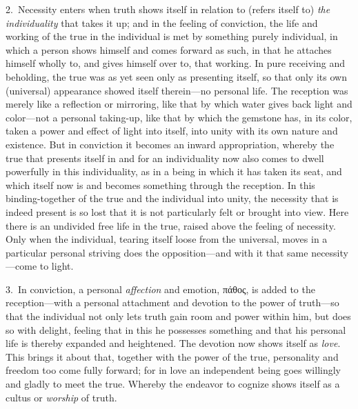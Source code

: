 \documentclass[12pt,a4paper]{book}
\begin{document}
2.~Necessity enters when truth shows itself in relation to (refers itself to)
\emph{the individuality} that takes it up; and in the feeling of conviction, the
life and working of the true in the individual is met by something purely
individual, in which a person shows himself and comes forward as such, in that
he attaches himself wholly to, and gives himself over to, that working. In pure
receiving and beholding, the true was as yet seen only as presenting itself, so
that only its own (universal) appearance showed itself therein---no personal
life. The reception was merely like a reflection or mirroring, like that by
which water gives back light and color---not a personal taking-up, like that by
which the gemstone has, in its color, taken a power and effect of light into
itself, into unity with its own nature and existence. But in conviction it
becomes an inward appropriation, whereby the true that presents itself in and
for an individuality now also comes to dwell powerfully in this individuality,
as in a being in which it has taken its seat, and which itself now is and
becomes something through the reception. In this binding-together of the true
and the individual into unity, the necessity that is indeed present is so lost
that it is not particularly felt or brought into view. Here there is an
undivided free life in the true, raised above the feeling of necessity.
Only when the individual, tearing itself loose from the universal, moves in a
particular personal striving does the opposition---and with it that same
necessity---come to light.

3.~In conviction, a personal \emph{affection} and emotion, πάθος, is added to
the reception---with a personal attachment and devotion to the power of
truth---so that the individual not only lets truth gain room and power within
him, but does so with delight, feeling that in this he possesses something and
that his personal life is thereby expanded and heightened. The devotion now
shows itself as \emph{love}. This brings it about that, together with the power
of the true, personality and freedom too come fully forward; for in love an
independent being goes willingly and gladly to meet the true. Whereby the
endeavor to cognize shows itself as a cultus or \emph{worship} of truth.
\end{document}
